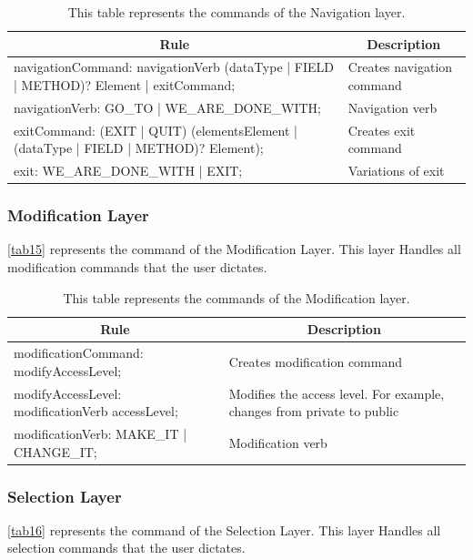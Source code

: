 \begin{table}[H]
	\centering
	\begin{tabular}{|p{8cm}|p{7cm}|}
		\hline
		\multicolumn{1}{|c|}{{\bf Rule}} & \multicolumn{1}{c|}{{\bf Description}} \\ \hline
		navigationCommand: navigationVerb (dataType | FIELD | METHOD)? Element | exitCommand; & Creates navigation command             \\ \hline
		navigationVerb: GO\_TO | WE\_ARE\_DONE\_WITH; & Navigation verb                        \\ \hline
		exitCommand: (EXIT | QUIT) (elementsElement | (dataType | FIELD | METHOD)? Element);  & Creates exit command                   \\ \hline
		exit: WE\_ARE\_DONE\_WITH | EXIT; & Variations of exit                     \\ \hline
	\end{tabular}
		\caption{This table represents the commands of the Navigation layer.}
		\label{tab14}
\end{table}

\subsubsection{Modification Layer}
\autoref{tab15} represents the command of the Modification Layer.  This layer Handles all modification commands that the user dictates.

\begin{table}[H]
	\centering
	\begin{tabular}{|p{8cm}|p{7cm}|}
		\hline
		\multicolumn{1}{|c|}{{\bf Rule}}                 & \multicolumn{1}{c|}{{\bf Description}}                                 \\ \hline
		modificationCommand: modifyAccessLevel;          & Creates modification command                                           \\ \hline
		modifyAccessLevel: modificationVerb accessLevel; & Modifies the access level. For example, changes from private to public \\ \hline
		modificationVerb: MAKE\_IT | CHANGE\_IT;         & Modification verb                                                      \\ \hline
	\end{tabular}
		\caption{This table represents the commands of the Modification layer.}
		\label{tab15}
\end{table}

\subsubsection{Selection Layer}
\autoref{tab16} represents the command of the Selection Layer.  This layer Handles all selection commands that the user dictates.


